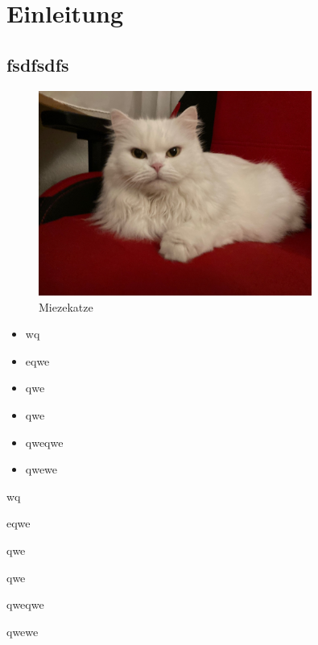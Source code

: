 \chapter{Einleitung}

\section{fsdfsdfs}

\blindtext[10]

\begin{figure}
\begin{center}
\includegraphics[width=0.8\textwidth]{Bilder/Katze.jpg}
\end{center}
\caption{Miezekatze}\label{fig:mieze}
\end{figure}


\blindtext[10]

\begin{itemize}
	\item wq
	\item eqwe
	\item qwe
	\item qwe
	\item qweqwe
	\item qwewe
\end{itemize}

\begin{compactitem}
	\item wq
	\item eqwe
	\item qwe
	\item qwe
	\item qweqwe
	\item qwewe
\end{compactitem}


